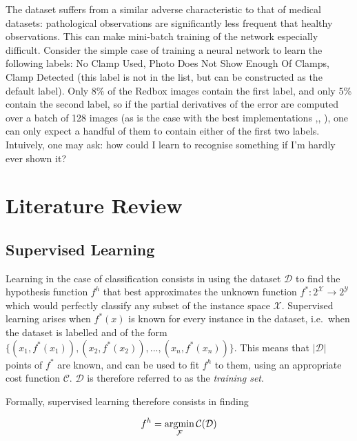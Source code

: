 \documentclass[a4paper,11pt]{article}
\begin{document}
The dataset suffers from a similar adverse characteristic to that of medical datasets: pathological observations are significantly less frequent that healthy observations. This can make mini-batch training of the network especially difficult. Consider the simple case of training a neural network to learn the following labels: No Clamp Used, Photo Does Not Show Enough Of Clamps, Clamp Detected (this label is not in the list, but can be constructed as the default label). Only 8\% of the Redbox images contain the first label, and only 5\% contain the second label, so if the partial derivatives of the error are computed over a batch of 128 images (as is the case with the best implementations \cite{krizhevsky},\cite{transfer-learning}, \cite{decaf}), one can only expect a handful of them to contain either of the first two labels. Intuively, one may ask: how could I learn to recognise something if I'm hardly ever shown it?\\



\clearpage

\section{Literature Review}

\subsection{Supervised Learning}

Learning in the case of classification consists in using the dataset $\mathcal{D}$ to find the hypothesis function $f^{h}$ that best approximates the unknown function $f^{*} : 2^{\mathcal{X}} \rightarrow 2^{\mathcal{Y}}$ which would perfectly classify any subset of the instance space $\mathcal{X}$. Supervised learning arises when $f^{*}(x)$ is known for every instance in the dataset, i.e.\ when the dataset is labelled and of the form $\{(x_{1},f^{*}(x_{1})),(x_{2},f^{*}(x_{2})), ..., (x_{n},f^{*}(x_{n}))\}$. This means that $|\mathcal{D}|$ points of $f^{*}$ are known, and can be used to fit $f^{h}$ to them, using an appropriate cost function $\mathcal{C}$. $\mathcal{D}$ is therefore referred to as the \textit{training set}. 

Formally, supervised learning therefore consists in finding

\begin{equation}
  f^{h} = \operatornamewithlimits{argmin}\limits_{\mathcal{F}}\operatorname{\mathcal{C}}(\mathcal{D})
\label{f7}
\end{equation}
  
\end{document}
